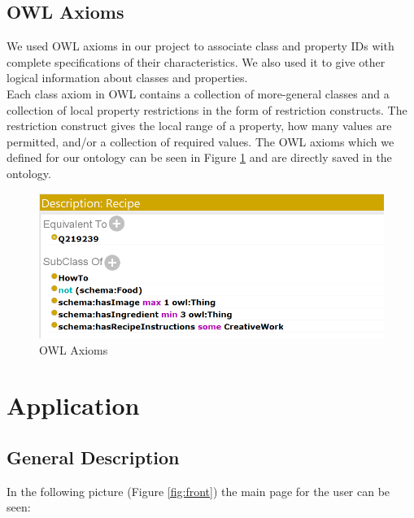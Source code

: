 \documentclass{article}
\begin{document}
\subsection{OWL Axioms}
We used OWL axioms in our project to associate class and property IDs with complete specifications of their characteristics. We also used it to give other logical information about classes and properties. \\
Each class axiom in OWL contains a collection of more-general classes and a collection of local property restrictions in the form of restriction constructs. The restriction construct gives the local range of a property, how many values are permitted, and/or a collection of required values. The OWL axioms which we defined for our ontology can be seen in Figure \ref{fig:owl} and are directly saved in the ontology.

\begin{figure}[H]
  \centering
  \includegraphics[width=12cm]{pictures/owl.png}
  \caption{OWL Axioms}
  \label{fig:owl}
\end{figure}
\noindent

\newpage

\section{Application}
\subsection{General Description}
In the following picture (Figure \ref{fig:front}) the main page for the user can be seen: \\
\end{document}
